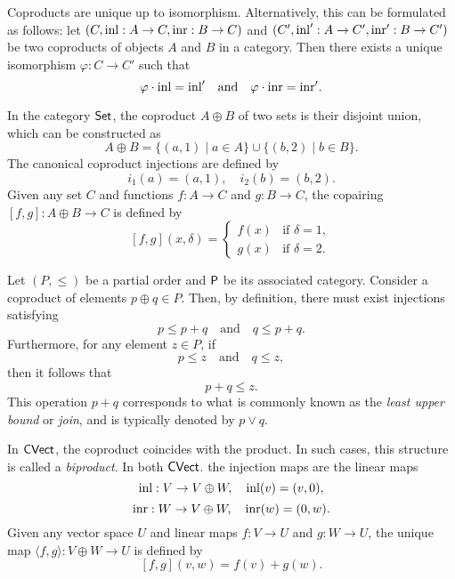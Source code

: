\begin{proposition} \cite[Proposition 3.12]{awodeyCategoryTheory2010} 
  Coproducts are unique up to isomorphism. Alternatively, this can be formulated as follows: let \((C, \mathrm{inl}: A \to C, \mathrm{inr}: B \to C)\) and \((C', \mathrm{inl}': A \to C', \mathrm{inr}': B \to C')\) be two coproducts of objects \(A\) and \(B\) in a category. Then there exists a unique isomorphism \(\varphi: C \to C'\) such that
\[
\varphi \cdot \mathrm{inl} = \mathrm{inl}' \quad \text{and} \quad \varphi \cdot \mathrm{inr} = \mathrm{inr}'.
\]
\end{proposition}

\begin{example}
  In the category $\mathsf{Set}$, the coproduct \( A \oplus B \) of two sets is their disjoint union, which can be constructed as
\[
A \oplus B = \{(a, 1) \mid a \in A\} \cup \{(b, 2) \mid b \in B\}.
\]
The canonical coproduct injections are defined by
\[
i_1(a) = (a, 1), \quad i_2(b) = (b, 2).
\]
Given any set \(C\) and functions \(f: A \to C\) and \(g: B \to C\), the copairing \([f, g]: A \oplus B \to C\) is defined by
\[
[f, g](x, \delta) = 
\begin{cases}
f(x) & \text{if } \delta = 1, \\
g(x) & \text{if } \delta = 2.
\end{cases}
\]
\end{example}

\begin{example}
  Let $(P, \leq)$ be a partial order and $\mathsf{P}$ be its associated category.  
Consider a coproduct of elements \( p \oplus q \in P \). Then, by definition, there must exist injections satisfying
\[
p \leq p + q \quad \text{and} \quad q \leq p + q.
\]
Furthermore, for any element \( z \in P \), if
\[
p \leq z \quad \text{and} \quad q \leq z,
\]
then it follows that
\[
p + q \leq z.
\]
This operation \( p + q \) corresponds to what is commonly known as the \emph{least upper bound} or \emph{join}, and is typically denoted by \( p \vee q \).
\end{example}


\begin{example}
  In $\mathsf{CVect}$, the coproduct coincides with the product. In such cases, this structure is called a \emph{biproduct}. 
  In both  $\mathsf{CVect}$. the injection maps are the linear maps
\[
\mathrm{inl}: V \to  V \oplus W, \quad  \mathrm{inl}(v)= (v,0),
\]
\[
\mathrm{inr} : W \to V \oplus W, \quad \mathrm{inr}(w) = (0,w).
\]
Given any vector space $U$ and linear maps $f: V \to U$ and $g: W \to U$, the unique map $\langle f, g\rangle : V \oplus W \to U$
is defined by
\[
[f, g] (v,w) = f(v)+ g(w).
\]
\end{example}



